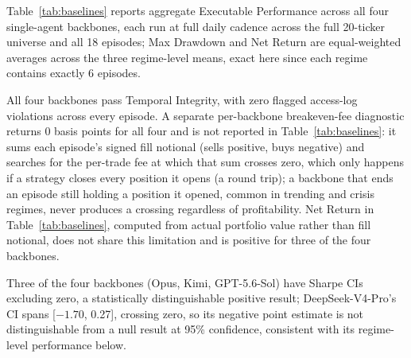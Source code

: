 \documentclass{article}
\begin{document}
\begin{table}[!ht]
  \caption{Aggregate Executable Performance across the four single-agent backbones.}
  \label{tab:baselines}
  \centering
\end{table}

Table~\ref{tab:baselines} reports aggregate Executable Performance across all four single-agent backbones, each run at full daily cadence across the full 20-ticker universe and all 18 episodes; Max Drawdown and Net Return are equal-weighted averages across the three regime-level means, exact here since each regime contains exactly 6 episodes.

All four backbones pass Temporal Integrity, with zero flagged access-log violations across every episode. A separate per-backbone breakeven-fee diagnostic returns 0 basis points for all four and is not reported in Table~\ref{tab:baselines}: it sums each episode's signed fill notional (sells positive, buys negative) and searches for the per-trade fee at which that sum crosses zero, which only happens if a strategy closes every position it opens (a round trip); a backbone that ends an episode still holding a position it opened, common in trending and crisis regimes, never produces a crossing regardless of profitability. Net Return in Table~\ref{tab:baselines}, computed from actual portfolio value rather than fill notional, does not share this limitation and is positive for three of the four backbones.

Three of the four backbones (Opus, Kimi, GPT-5.6-Sol) have Sharpe CIs excluding zero, a statistically distinguishable positive result; DeepSeek-V4-Pro's CI spans [$-1.70$, 0.27], crossing zero, so its negative point estimate is not distinguishable from a null result at 95\% confidence, consistent with its regime-level performance below.
\end{document}
